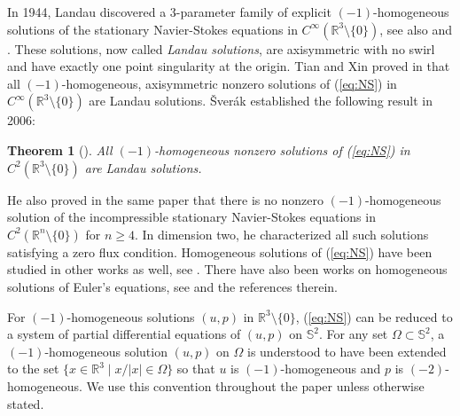\documentclass[12pt]{article}
\newtheorem{theorem}{Theorem}
\newcommand{\bS}{\mathbb{S}}
\begin{document}
In 1944, Landau \cite{Landau} discovered a 3-parameter family of explicit $(-1)$-homogeneous solutions of the stationary Navier-Stokes equations in $C^\infty(\mathbb{R}^3\setminus\{0\})$, see also \cite{Slezkin} and \cite{Squire}. These solutions, now called \emph{Landau solutions}, are axisymmetric with no swirl and have exactly one point singularity at the origin. Tian and Xin proved in \cite{TianXin} that all $(-1)$-homogeneous, axisymmetric nonzero solutions of (\ref{eq:NS}) in $C^\infty(\mathbb{R}^3\setminus\{0\})$ are Landau solutions. \v{S}ver\'{a}k established the following result in 2006:
\begin{theorem}[\cite{Sverak}]\label{thm:Sverak}
	All $(-1)$-homogeneous nonzero solutions of (\ref{eq:NS}) in $C^2(\mathbb{R}^3\setminus\{0\})$ are Landau solutions.
\end{theorem}
He also proved in the same paper that there is no nonzero $(-1)$-homogeneous solution of the incompressible stationary Navier-Stokes equations in $C^{2}(\mathbb{R}^n\setminus\{0\})$ for $n\ge 4$. In dimension two, he characterized all such solutions satisfying a zero flux condition. Homogeneous solutions of (\ref{eq:NS}) have been studied in other works as well, see \cite{CKPW, Goldshtik, Gusarov, JLL, KT, LZZ, PP1, PP2, PP3, Serrin, Slezkin, Squire, Wang, Yatseyev, ZZ}. There have also been works on homogeneous solutions of Euler's equations, see \cite{Abe, LS, Shvydkoy} and the references therein. 

For $(-1)$-homogeneous solutions $(u, p)$ in $\mathbb{R}^3\setminus\{0\}$, (\ref{eq:NS}) can be reduced to a system of partial differential equations of $(u, p)$ on $\mathbb{S}^2$. For any set $\Omega\subset\bS^2$, a $(-1)$-homogeneous solution $(u, p)$ on $\Omega$ is understood to have been extended to the set $\{x\in \mathbb{R}^3\mid x/|x|\in \Omega\}$ so that $u$ is $(-1)$-homogeneous and $p$ is $(-2)$-homogeneous. We use this convention throughout the paper unless otherwise stated. 
\end{document}
